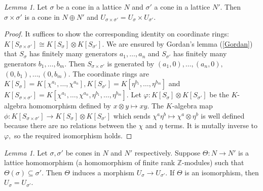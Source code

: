 \documentclass[BSc]{usydthesis}
\numberwithin{equation}{chapter}
\theoremstyle{remark}
\newtheorem{Lemma}[equation]{Lemma}
\newcommand{\Z}{\mathbb{Z}}
\begin{document}
\begin{Lemma} \label{coneproduct} Let $\sigma$ be a cone in a lattice $N$ and $\sigma'$ a cone in a lattice $N'.$ Then $\sigma \times \sigma'$ is a cone in $N\oplus N'$ and $U_{\sigma \times \sigma'} = U_{\sigma} \times U_{\sigma'}.$
\end{Lemma}

\begin{proof} It suffices to show the corresponding identity on coordinate rings: $K[S_{\sigma \times \sigma'} ] \cong K[S_{\sigma}] \otimes K[S_{\sigma'}].$ We are ensured by Gordan's lemma (\ref{Gordan}) that $S_{\sigma}$ has finitely many generators $a_1, \ldots, a_n$ and $S_{\sigma'}$ has finitely many generators $b_1, \ldots, b_m.$ Then $S_{\sigma \times \sigma'}$ is generated by $(a_1,0),\ldots, (a_n,0),$ $ (0,b_1), \ldots, (0,b_m).$ The coordinate rings are $K[S_{\sigma}] = K[\chi^{a_1}, \ldots, \chi^{a_n}] , K[S_{\sigma'}] = K[\eta^{b_1}, \ldots, \eta^{b_m} ] $ and $K[S_{\sigma \times \sigma'}] = K[\chi^{a_1}, \ldots, \chi^{a_n}, \eta^{b_1}, \ldots, \eta^{b_m} ].$ Let $\varphi: K[S_{\sigma}] \otimes K[S_{\sigma'}]$ be the $K$-algebra homomorphism defined by $x \otimes y \mapsto xy.$ The $K$-algebra map $\phi: K[S_{\sigma\times \sigma'}] \to K[S_{\sigma}] \otimes K[S_{\sigma'}]$ which sends $\chi^a \eta^b \mapsto \chi^a \otimes \eta^b$ is well defined because there are no relations between the $\chi$ and $\eta$ terms. It is mutally inverse to $\varphi,$ so the required isomorphism holds.
\end{proof}

\begin{Lemma} \label{AffineToricMorphism} Let $\sigma, \sigma'$ be cones in $N$ and $N'$ respectively. Suppose $\Theta : N \to N'$ is a lattice homomorphism (a homomorphism of finite rank $\Z$-modules) such that $\Theta(\sigma)\subseteq \sigma'.$ Then $\Theta$ induces a morphism $U_{\sigma}\to U_{\sigma'}.$ If $\Theta$ is an isomorphism, then $U_{\sigma} = U_{\sigma'}.$
\end{Lemma}
 
\end{document}
